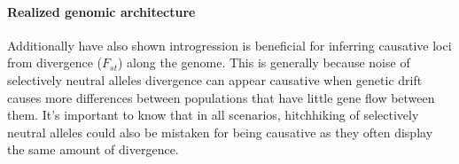 \documentclass{article}
\begin{document}
\paragraph{Realized genomic architecture}
Additionally have also shown introgression is beneficial for inferring causative loci from divergence ($F_{st}$) along the genome. 
This is generally because noise of selectively neutral alleles divergence can appear causative when genetic drift causes more 
differences between populations that have little gene flow between them.
It's important to know that in all scenarios, hitchhiking of selectively neutral alleles could also be 
mistaken for being causative as they often display the same amount of divergence.

\end{document}
